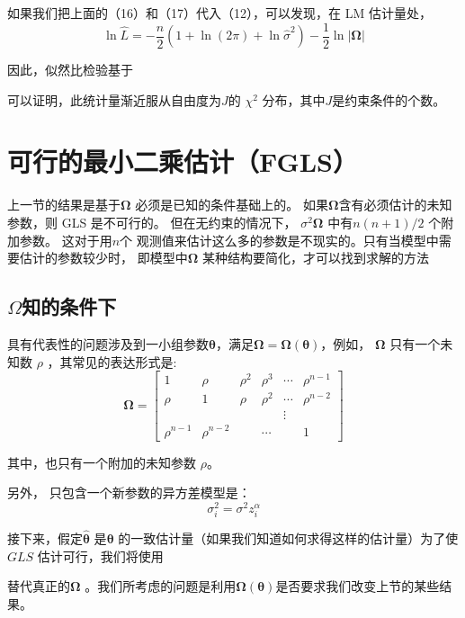     如果我们把上面的（16）和（17）代入（12），可以发现，在 LM 估计量处，
    $$ \ln \hat{L}=-\frac{n}{2}\left(1+\ln (2 \pi)+\ln \hat{\sigma}^{2}\right)-\frac{1}{2} \ln |\boldsymbol{\Omega}| $$

    因此，似然比检验基于

    可以证明，此统计量渐近服从自由度为$ J $的 $ \chi^{2} $ 分布，其中$ J $是约束条件的个数。

\section{可行的最小二乘估计（FGLS）}

上一节的结果是基于$ \boldsymbol{\Omega} $ 必须是已知的条件基础上的。
如果$ \boldsymbol{\Omega} $含有必须估计的未知参数，则 GLS 是不可行的。
但在无约束的情况下， $ \sigma^{2} \boldsymbol{\Omega}$ 中有$ n(n+1)/2 $ 个附加参数。
这对于用$ n $个 观测值来估计这么多的参数是不现实的。只有当模型中需要估计的参数较少时，
即模型中$ \boldsymbol{\Omega} $ 某种结构要简化，才可以找到求解的方法

\subsection{ \texorpdfstring{$\Omega$} 未知的条件下}

具有代表性的问题涉及到一小组参数$ \boldsymbol{\theta} $，满足$ \boldsymbol{\Omega}=\boldsymbol{\Omega(\theta)} $，例如， $ \boldsymbol{\Omega} $ 
只有一个未知数 $ \rho $ ，其常见的表达形式是:
$$ \boldsymbol{\Omega} =\left[
    \begin{array}{cccccc}
        1 & \rho & \rho^{2} & \rho^{3} & \cdots & \rho^{n-1} \\
        \rho & 1 & \rho & \rho^{2} & \cdots & \rho^{n-2} \\
        & & & & \vdots & \\
        \rho^{n-1} & \rho^{n-2} & & \cdots & & 1
    \end{array}\right] $$

    其中，也只有一个附加的未知参数 $ \rho $。

    另外， 只包含一个新参数的异方差模型是：
    $$ \sigma_{i}^{2}=\sigma^{2} z_{i}^{\alpha} $$

    接下来，假定$ \boldsymbol{\hat{\theta}} $ 是$ \boldsymbol{\theta} $ 的一致估计量（如果我们知道如何求得这样的估计量）为了使 $ GLS $ 估计可行，我们将使用

    替代真正的$ \boldsymbol{\Omega} $ 。我们所考虑的问题是利用$ \boldsymbol{\Omega (\theta)}$是否要求我们改变上节的某些结果。

